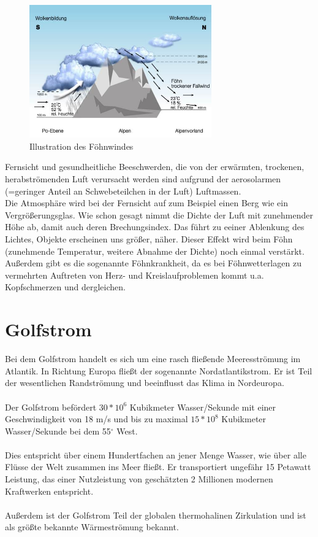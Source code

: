 \documentclass[11pt, a4paper]{article}
\begin{document}
\begin{figure}[h!]
	\centering
	\includegraphics[width=0.7\textwidth]{images/foehn}
	\caption{Illustration des Föhnwindes \cite{foehn-image}}
\end{figure}

\noindent Fernsicht und gesundheitliche Beeschwerden, die von der erwärmten, trockenen, herabströmenden Luft verursacht werden sind aufgrund der aerosolarmen (=geringer Anteil an Schwebeteilchen in der Luft) Luftmassen. \\
Die Atmosphäre wird bei der Fernsicht auf zum Beispiel einen Berg wie ein Vergrößerungsglas. Wie schon gesagt nimmt die Dichte der Luft mit zunehmender Höhe ab, damit auch deren Brechungsindex. Das führt zu eeiner Ablenkung des Lichtes, Objekte erscheinen uns größer, näher. Dieser Effekt wird beim Föhn (zunehmende Temperatur, weitere Abnahme der Dichte) noch einmal verstärkt. \\

Außerdem gibt es die sogenannte Föhnkrankheit, da es bei Föhnwetterlagen zu vermehrten Auftreten von Herz- und Kreislaufproblemen kommt u.a. Kopfschmerzen und dergleichen.

\newpage
\section{Golfstrom}

Bei dem Golfstrom handelt es sich um eine rasch fließende Meeresströmung im Atlantik. In Richtung Europa fließt der sogenannte Nordatlantikstrom. Er ist Teil der wesentlichen Randströmung und beeinflusst das Klima in Nordeuropa. \\ \\
Der Golfstrom befördert $30*10^{6} $ Kubikmeter Wasser/Sekunde mit einer Geschwindigkeit von 18 m/s und bis zu maximal $15*10^{8}$ Kubikmeter Wasser/Sekunde bei dem 55$^{\circ}$ West. \\ \\
Dies entspricht über einem Hundertfachen an jener Menge Wasser, wie über alle Flüsse der Welt zusammen ins Meer fließt. Er transportiert ungefähr 15 Petawatt Leistung, das einer Nutzleistung von geschätzten 2 Millionen modernen Kraftwerken entspricht. \\ \\
Außerdem ist der Golfstrom Teil der globalen thermohalinen Zirkulation und ist als größte bekannte Wärmeströmung bekannt.
\end{document}
